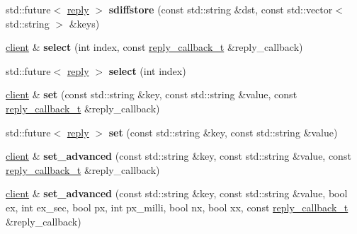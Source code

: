 \begin{DoxyCompactItemize}
\mbox{\label{classcpp__redis_1_1client_afd4930fd767bbf14bae1f5ddfd8ee212}} 
std\+::future$<$ \mbox{\hyperlink{classcpp__redis_1_1reply}{reply}} $>$ {\bfseries sdiffstore} (const std\+::string \&dst, const std\+::vector$<$ std\+::string $>$ \&keys)
\item 
\mbox{\label{classcpp__redis_1_1client_aee37b9bd265b8db614b4d7dcfdbaa422}} 
\mbox{\hyperlink{classcpp__redis_1_1client}{client}} \& {\bfseries select} (int index, const \mbox{\hyperlink{classcpp__redis_1_1client_af7a65eb21aa25230bfbb0b0203c4fc04}{reply\+\_\+callback\+\_\+t}} \&reply\+\_\+callback)
\item 
\mbox{\label{classcpp__redis_1_1client_a5eae97b05129d0571c3b871e1a786434}} 
std\+::future$<$ \mbox{\hyperlink{classcpp__redis_1_1reply}{reply}} $>$ {\bfseries select} (int index)
\item 
\mbox{\label{classcpp__redis_1_1client_a6d654139ca804e9ee2ac0d0683878ece}} 
\mbox{\hyperlink{classcpp__redis_1_1client}{client}} \& {\bfseries set} (const std\+::string \&key, const std\+::string \&value, const \mbox{\hyperlink{classcpp__redis_1_1client_af7a65eb21aa25230bfbb0b0203c4fc04}{reply\+\_\+callback\+\_\+t}} \&reply\+\_\+callback)
\item 
\mbox{\label{classcpp__redis_1_1client_a734ba95a7e2083fe6bc2e209f94ccab6}} 
std\+::future$<$ \mbox{\hyperlink{classcpp__redis_1_1reply}{reply}} $>$ {\bfseries set} (const std\+::string \&key, const std\+::string \&value)
\item 
\mbox{\label{classcpp__redis_1_1client_aac03b242d1a0948a9eb3567624e72622}} 
\mbox{\hyperlink{classcpp__redis_1_1client}{client}} \& {\bfseries set\+\_\+advanced} (const std\+::string \&key, const std\+::string \&value, const \mbox{\hyperlink{classcpp__redis_1_1client_af7a65eb21aa25230bfbb0b0203c4fc04}{reply\+\_\+callback\+\_\+t}} \&reply\+\_\+callback)
\item 
\mbox{\label{classcpp__redis_1_1client_a60db35e46bcbe36e5264ee04933162fd}} 
\mbox{\hyperlink{classcpp__redis_1_1client}{client}} \& {\bfseries set\+\_\+advanced} (const std\+::string \&key, const std\+::string \&value, bool ex, int ex\+\_\+sec, bool px, int px\+\_\+milli, bool nx, bool xx, const \mbox{\hyperlink{classcpp__redis_1_1client_af7a65eb21aa25230bfbb0b0203c4fc04}{reply\+\_\+callback\+\_\+t}} \&reply\+\_\+callback)

\end{DoxyCompactItemize}
